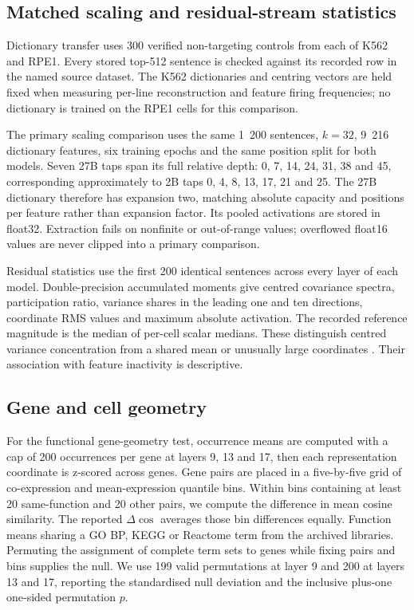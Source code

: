 \documentclass[review,authoryear,12pt]{elsarticle}
\begin{document}
\subsection{Matched scaling and residual-stream statistics}

Dictionary transfer uses 300 verified non-targeting controls from each of K562 and RPE1.
Every stored top-512 sentence is checked against its recorded row in the named source dataset.
The K562 dictionaries and centring vectors are held fixed when measuring per-line reconstruction
and feature firing frequencies; no dictionary is trained on the RPE1 cells for this comparison.

The primary scaling comparison uses the same 1~200 sentences, $k=32$, 9~216 dictionary features,
six training epochs and the same position split for both models. Seven 27B taps span its full
relative depth: 0, 7, 14, 24, 31, 38 and 45, corresponding approximately to 2B taps
0, 4, 8, 13, 17, 21 and 25. The 27B dictionary therefore has expansion two, matching absolute
capacity and positions per feature rather than expansion factor. Its pooled activations are stored
in float32. Extraction fails on nonfinite or out-of-range values; overflowed float16 values are
never clipped into a primary comparison.

Residual statistics use the first 200 identical sentences across every layer of each model.
Double-precision accumulated moments give centred covariance spectra, participation ratio,
variance shares in the leading one and ten directions, coordinate RMS values and maximum absolute
activation. The recorded reference magnitude is the median of per-cell scalar medians.
These distinguish centred variance concentration from a shared mean or unusually large coordinates
\citep{refMassiveActivations,refAnisotropy}. Their association with feature inactivity is descriptive.

\subsection{Gene and cell geometry}

For the functional gene-geometry test, occurrence means are computed with a cap of 200 occurrences
per gene at layers 9, 13 and 17, then each representation coordinate is z-scored across genes.
Gene pairs are placed in a five-by-five grid of co-expression and mean-expression quantile bins.
Within bins containing at least 20 same-function and 20 other pairs, we compute the difference in
mean cosine similarity. The reported $\Delta\cos$ averages those bin differences equally.
Function means sharing a GO BP, KEGG or Reactome term from the archived libraries.
Permuting the assignment of complete term sets to genes while fixing pairs and bins supplies the
null. We use 199 valid permutations at layer 9 and 200 at layers 13 and 17, reporting the
standardised null deviation and the inclusive plus-one one-sided permutation $p$.
\end{document}
